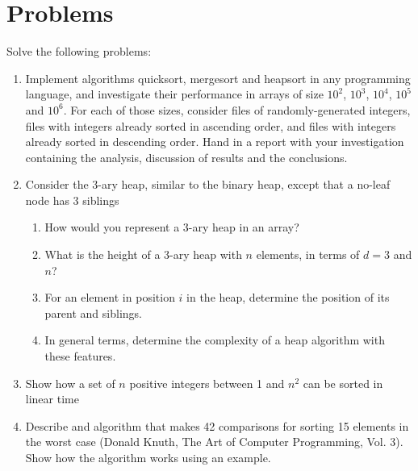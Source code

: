 \documentclass{article}
\begin{document}
\section{Problems}
Solve the following problems:
\begin{enumerate}
    \item Implement algorithms quicksort, mergesort and heapsort in any programming language, and investigate their performance in arrays of size $10^2$, $10^3$, $10^4$, $10^5$ and $10^6$. For each of those sizes, consider files of  randomly-generated  integers,  files  with  integers  already  sorted  in  ascending  order,  and  files  with integers already sorted in descending order. Hand in a report with your investigation containing the analysis, discussion of results and the conclusions.

    \item Consider the 3-ary heap, similar to the binary heap, except that a no-leaf node has 3 siblings
    \begin{enumerate}
        \item How would you represent a 3-ary heap in an array?
        \item What is the height of a 3-ary heap with $n$ elements, in terms of $d = 3$ and $n$?
        \item For an element in position $i$ in the heap, determine the position of its parent and siblings.
        \item In general terms, determine the complexity of a heap algorithm with these features.
    \end{enumerate}

    \item Show how a set of $n$ positive integers between 1 and $n^2$ can be sorted in linear time
    \item Describe and algorithm that makes 42 comparisons for sorting 15 elements in the worst case (Donald Knuth, The Art of Computer Programming, Vol. 3). Show how the algorithm works using an example.
\end{enumerate}
\end{document}
